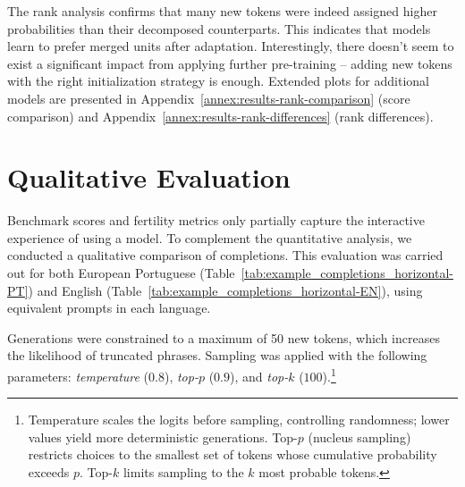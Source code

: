 The rank analysis confirms that many new tokens were indeed assigned higher probabilities than their decomposed counterparts. This indicates that models learn to prefer merged units after adaptation. Interestingly, there doesn't seem to exist a significant impact from applying further pre-training -- adding new tokens with the right initialization strategy is enough. Extended plots for additional models are presented in Appendix~\ref{annex:results-rank-comparison} (score comparison) and Appendix~\ref{annex:results-rank-differences} (rank differences).




\section{Qualitative Evaluation}
Benchmark scores and fertility metrics only partially capture the interactive experience of using a model. To complement the quantitative analysis, we conducted a qualitative comparison of completions. 
This evaluation was carried out for both European Portuguese (Table~\ref{tab:example_completions_horizontal-PT}) and English (Table~\ref{tab:example_completions_horizontal-EN}), using equivalent prompts in each language.

Generations were constrained to a maximum of 50 new tokens, which increases the likelihood of truncated phrases. Sampling was applied with the following parameters: \textit{temperature} ($0.8$), \textit{top-$p$} ($0.9$), and \textit{top-$k$} ($100$).\footnote{%
Temperature scales the logits before sampling, controlling randomness; lower values yield more deterministic generations. 
Top-$p$ (nucleus sampling) restricts choices to the smallest set of tokens whose cumulative probability exceeds $p$. 
Top-$k$ limits sampling to the $k$ most probable tokens.}





